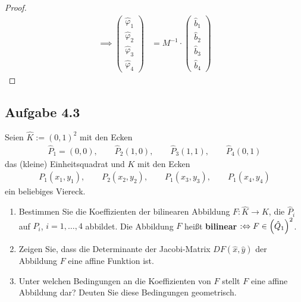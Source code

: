 \begin{proof}
\begin{align*}
		\implies\begin{pmatrix}
			\hat{\varphi}_1\\ 
			\hat{\varphi}_2 \\ 
			\hat{\varphi}_3 \\ 
			\hat{\varphi}_4
		\end{pmatrix}&=M^{-1}\cdot\begin{pmatrix}
			\hat{b}_1\\ 
			\hat{b}_2 \\ 
			\hat{b}_3 \\ 
			\hat{b}_4
		\end{pmatrix}
	\end{align*}
\end{proof}

\subsection{Aufgabe 4.3}
Seien $\hat{K}:=(0,1)^2$ mit den Ecken 
\begin{align*}
	\hat{P}_1=(0,0),\qquad
	\hat{P}_2(1,0),\qquad
	\hat{P}_3(1,1),\qquad
	\hat{P}_4(0,1)
\end{align*}
das (kleine) Einheitsquadrat und $K$ mit den Ecken
\begin{align*}
	P_1(x_1,y_1),\qquad
	P_2(x_2,y_2),\qquad
	P_1(x_3,y_3),\qquad
	P_1(x_4,y_4)
\end{align*}
ein beliebiges Viereck.
\begin{enumerate}[label=(\alph*)]
	\item Bestimmen Sie die Koeffizienten der bilinearen Abbildung $F:\hat{K}\to K$, die $\hat{P}_i$ auf $P_i$, $i=1,\ldots,4$ abbildet. 
	Die Abbildung $F$ heißt \textbf{bilinear} $:\Leftrightarrow F\in\left(\hat{Q}_1\right)^2$.
	\item Zeigen Sie, dass die Determinante der Jacobi-Matrix $DF(\hat{x},\hat{y})$ der Abbildung $F$ eine affine Funktion ist.
	\item Unter welchen Bedingungen an die Koeffizienten von $F$ stellt $F$ eine affine Abbildung dar? Deuten Sie diese Bedingungen geometrisch.
\end{enumerate}

